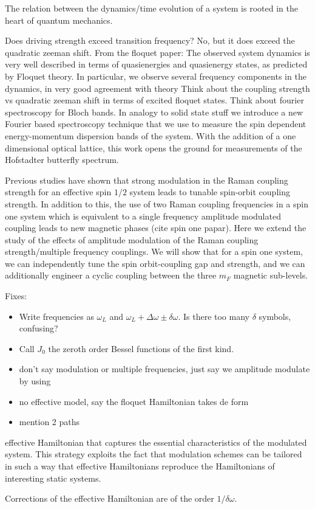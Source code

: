 The relation between the dynamics/time evolution of a system is rooted in the heart of quantum mechanics. 






Does driving strength exceed transition frequency? No, but it does exceed the quadratic zeeman shift. 
From the floquet paper: The observed  system dynamics is very well described in terms of
quasienergies and quasienergy states, as predicted by
Floquet theory. In particular, we observe several frequency
components in the dynamics, in very good agreement with
theory
Think about the coupling strength vs quadratic zeeman shift in terms of excited floquet states. 
Think about fourier spectroscopy for Bloch bands.
In analogy to solid state stuff we introduce a new Fourier based spectroscopy technique that we use to measure the spin dependent energy-momentum dispersion bands of the system. With the addition of a one dimensional optical lattice, this work opens the ground for measurements of the Hofstadter butterfly spectrum. 


Previous studies have shown that strong modulation in the Raman coupling strength for an effective spin $1/2$ system leads to tunable spin-orbit coupling strength. In addition to this, the use of two Raman coupling frequencies in a spin one system which is equivalent to a single frequency amplitude modulated coupling leads to new magnetic phases (cite spin one papar). Here we extend the study of the effects of amplitude modulation of the Raman coupling strength/multiple frequency couplings. We will show that for a spin one system, we can independently  tune the spin orbit-coupling gap and strength, and we can additionally engineer a cyclic coupling between the three $m_F$ magnetic sub-levels. 



Fixes:
\begin{itemize}
	\item Write frequencies as $\omega_L$ and $\omega_L +\Delta\omega \pm\delta\omega$. Is there too many $\delta$ symbols, confusing?
	\item Call $J_0$ the zeroth order Bessel functions of the first kind.
	\item don't say modulation or multiple frequencies, just say we amplitude modulate by using 
	\item no effective model, say the floquet Hamiltonian takes de form
	\item mention 2 paths
\end{itemize}


effective Hamiltonian that captures the essential characteristics
of the modulated system. This strategy exploits the
fact that modulation schemes can be tailored in such a way
that effective Hamiltonians reproduce the Hamiltonians
of interesting static systems.

Corrections of the effective Hamiltonian are of the order $1/\delta\omega$.
